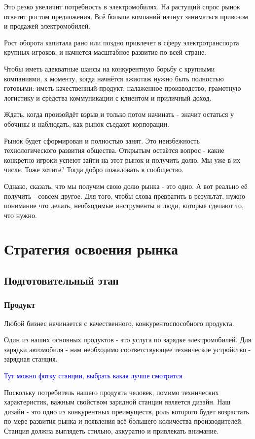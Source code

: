 \documentclass[a4paper,12pt]{report}
\begin{document}
Это резко увеличит потребность в электромобилях. На растущий спрос рынок ответит ростом предложения. Всё больше компаний начнут заниматься привозом и продажей электромобилей. 

Рост оборота капитала рано или поздно привлечет в сферу электротранспорта крупных игроков, и начнется масштабное развитие по всей стране.

Чтобы иметь адекватные шансы на конкурентную борьбу с крупными компаниями, к моменту, когда начнётся ажиотаж нужно быть полностью готовыми: иметь качественный продукт, налаженное производство, грамотную логистику и средства коммуникации с клиентом и приличный доход. 

Ждать, когда произойдёт взрыв и только потом начинать - значит остаться у обочины и наблюдать, как рынок съедают корпорации.

Рынок будет сформирован и полностью занят. Это неизбежность технологического развития общества. Открытым остаётся вопрос - какие конкретно игроки успеют зайти на этот рынок и получить долю. Мы уже в их числе. Тоже хотите? Тогда добро пожаловать в сообщество. 

Однако, сказать, что мы получим свою долю рынка - это одно. А вот реально её получить - совсем другое. Для того, чтобы слова превратить в результат, нужно понимание что делать, необходимые инструменты и люди, которые сделают то, что нужно. 


\chapter{Стратегия освоения рынка}

\section{Подготовительный этап}
\subsection{Продукт}

Любой бизнес начинается с качественного, конкурентоспособного продукта. 

Один из наших основных продуктов - это услуга по зарядке электромобилей. Для зарядки автомобиля - нам необходимо соответствующее техническое устройство - зарядная станция. 

\textcolor{blue}{Тут можно фотку станции, выбрать какая лучше смотрится}

Поскольку потребитель нашего продукта человек, помимо технических характеристик, важным свойством зарядной станции является дизайн. Наш дизайн - это одно из конкурентных преимуществ, роль которого будет возрастать по мере развития рынка и появления всё большего количества производителей. Станция должна выглядеть стильно, аккуратно и привлекать внимание. 
\end{document}
